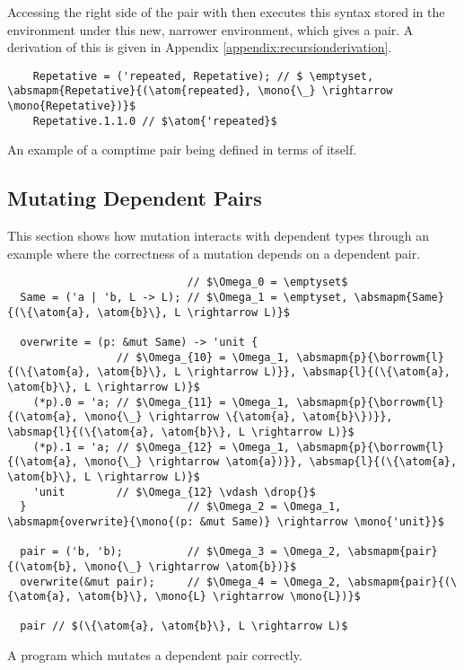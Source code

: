 \documentclass[12pt,twoside]{report}
\begin{document}
Accessing the right side of the pair with  then executes this syntax stored in the environment under this new, narrower environment, which gives a pair. A derivation of this is given in Appendix \ref{appendix:recursionderivation}.

\begin{listing}
  \begin{verbatim}
    Repetative = ('repeated, Repetative); // $ \emptyset, \absmapm{Repetative}{(\atom{repeated}, \mono{\_} \rightarrow \mono{Repetative})}$
    Repetative.1.1.0 // $\atom{'repeated}$
  \end{verbatim}
  \caption{An example of a comptime pair being defined in terms of itself.}
  \label{listing:recursioncomptime}
\end{listing}



\subsection{Mutating Dependent Pairs}
\label{section:mutatingpairs}
This section shows how mutation interacts with dependent types through an example where the correctness of a mutation depends on a dependent pair.

\begin{listing}
\begin{verbatim}
                            // $\Omega_0 = \emptyset$
  Same = ('a | 'b, L -> L); // $\Omega_1 = \emptyset, \absmapm{Same}{(\{\atom{a}, \atom{b}\}, L \rightarrow L)}$

  overwrite = (p: &mut Same) -> 'unit {
                 // $\Omega_{10} = \Omega_1, \absmapm{p}{\borrowm{l}{(\{\atom{a}, \atom{b}\}, L \rightarrow L)}}, \absmap{l}{(\{\atom{a}, \atom{b}\}, L \rightarrow L)}$
    (*p).0 = 'a; // $\Omega_{11} = \Omega_1, \absmapm{p}{\borrowm{l}{(\atom{a}, \mono{\_} \rightarrow \{\atom{a}, \atom{b}\})}}, \absmap{l}{(\{\atom{a}, \atom{b}\}, L \rightarrow L)}$
    (*p).1 = 'a; // $\Omega_{12} = \Omega_1, \absmapm{p}{\borrowm{l}{(\atom{a}, \mono{\_} \rightarrow \atom{a})}}, \absmap{l}{(\{\atom{a}, \atom{b}\}, L \rightarrow L)}$
    'unit        // $\Omega_{12} \vdash \drop{}$
  }                         // $\Omega_2 = \Omega_1, \absmapm{overwrite}{\mono{(p: &mut Same)} \rightarrow \mono{'unit}}$

  pair = ('b, 'b);          // $\Omega_3 = \Omega_2, \absmapm{pair}{(\atom{b}, \mono{\_} \rightarrow \atom{b})}$
  overwrite(&mut pair);     // $\Omega_4 = \Omega_2, \absmapm{pair}{(\{\atom{a}, \atom{b}\}, \mono{L} \rightarrow \mono{L})}$

  pair // $(\{\atom{a}, \atom{b}\}, L \rightarrow L)$
\end{verbatim}
\caption{A program which mutates a dependent pair correctly.}
\label{listing:mutatedependent}
\end{listing}
\end{document}
